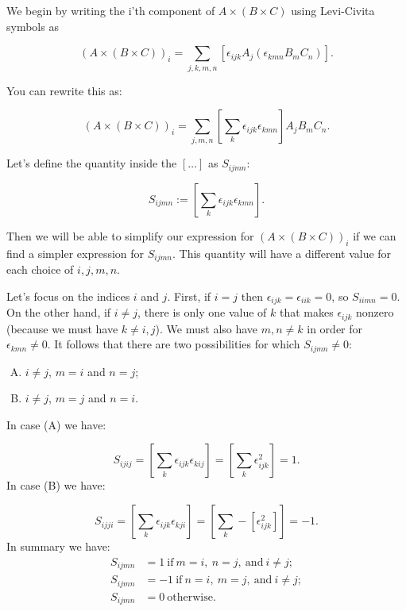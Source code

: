 We begin by writing the i'th component of $A \times (B \times C)$ using Levi-Civita symbols as %

\[ \left( A \times (B \times C) \right)_i =\sum_{j,k,m,n} \left[ \epsilon_{ijk} A_j( \epsilon_{kmn} B_m C_n )\right]. \]

You can rewrite this as: 

\[ \left( A \times (B \times C) \right)_i =  \sum_{j,m,n} \left[ \sum_k \epsilon_{ijk} \epsilon_{kmn} \right] A_j B_m C_n. \]

Let's define the quantity inside the $[ \dots ]$ as $S_{ijmn}$:

	\[ S_{ijmn} :=  \left[ \sum_k \epsilon_{ijk} \epsilon_{kmn} \right]. \]

Then we will be able to simplify our expression for $\left( A \times (B \times C) \right)_i$ if we can find a simpler expression for $S_{ijmn}$.  This quantity will have a different value for each choice of $i,j,m,n$.  

Let's focus on the indices $i$ and $j$. First, if $i=j$
then  $\epsilon_{ijk} =  \epsilon_{iik} = 0$, so $S_{iimn} = 0$.  On the other hand, if $i \neq j$, there is only one value of $k$ that makes $\epsilon_{ijk}$ nonzero (because we must have $k \neq i,j$). We must also have $m,n \neq k$ in 
order for $\epsilon_{kmn} \neq 0$.  It follows that there are two possibilities for which $S_{ijmn} \neq 0$:  
\begin{enumerate}[(A)]
\item
$i \neq j$, $m=i$ and $n=j$;
\item
$i \neq j$, $m=j$ and $n=i$.
\end{enumerate}

In case (A) we have:

\[ S_{ijij} =  \left[ \sum_k \epsilon_{ijk} \epsilon_{kij} \right] = \left[ \sum_k \epsilon_{ijk}^2 \right] = 1. \]
In case (B) we have:  

\[ S_{ijji} =  \left[ \sum_k \epsilon_{ijk} \epsilon_{kji} \right] = \left[ \sum_k -\left[\epsilon_{ijk}^2 \right] \right] = -1. \]
In summary we have:
\begin{align*}
S_{ijmn} &= 1 ~ \text{if}~ m=i,~ n=j, ~ \text{and}~ i\neq j ;\\
S_{ijmn}& = -1 ~ \text{if}~ n=i,~ m=j, ~ \text{and}~ i\neq j; \\
S_{ijmn}& = 0~\text{otherwise}.
\end{align*}

